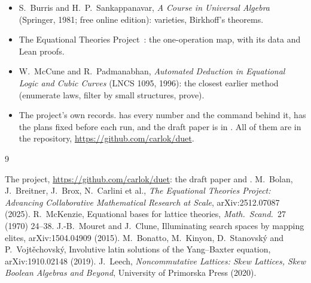 \documentclass[11pt,a4paper]{article}
\begin{document}
\begin{itemize}
\item S.~Burris and H.~P.~Sankappanavar, \emph{A Course in Universal Algebra} (Springer, 1981; free online edition):
  varieties, Birkhoff's theorems.
\item The Equational Theories Project~\cite{etp}: the one-operation map, with its data and Lean proofs.
\item W.~McCune and R.~Padmanabhan, \emph{Automated Deduction in Equational Logic and Cubic Curves} (LNCS 1095,
  1996): the closest earlier method (enumerate laws, filter by small structures, prove).
\item The project's own records.  has every number and the command behind it,
   has the plans fixed before each run, and the draft paper is in . All of them
  are in the repository, \url{https://github.com/carlok/duet}.
\end{itemize}



\begin{thebibliography}{9}\setlength{\itemsep}{1pt}
 The \proj{} project, \url{https://github.com/carlok/duet}: the draft paper  and .
 M.~Bolan, J.~Breitner, J.~Brox, N.~Carlini et al., \emph{The Equational Theories Project: Advancing
  Collaborative Mathematical Research at Scale}, arXiv:2512.07087 (2025).
 R.~McKenzie, Equational bases for lattice theories, \emph{Math.\ Scand.}\ 27 (1970) 24--38.
 J.-B.~Mouret and J.~Clune, Illuminating search spaces by mapping elites, arXiv:1504.04909 (2015).
 M.~Bonatto, M.~Kinyon, D.~Stanovsk\'y and P.~Vojt\v{e}chovsk\'y, Involutive latin solutions of the
  Yang--Baxter equation, arXiv:1910.02148 (2019).
 J.~Leech, \emph{Noncommutative Lattices: Skew Lattices, Skew Boolean Algebras and Beyond},
  University of Primorska Press (2020).
\end{thebibliography}
\end{document}
